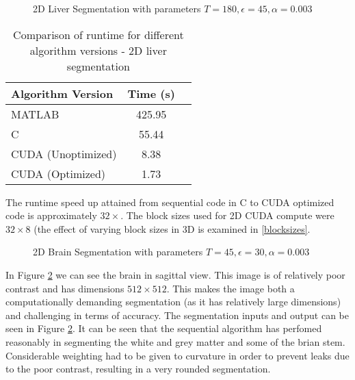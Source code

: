  
\begin{figure}[h]
  \begin{center}
  \end{center}
  \caption{2D Liver Segmentation with parameters $T = 180, \epsilon = 45, \alpha = 0.003$}
  \label{fig:liver}
\end{figure}

\begin{table}[h]
\centering
\begin{tabular}{ | l | c | r | }
	\hline
	Algorithm Version  & Time (s)\\ \hline
  MATLAB 						 & 425.95 \\
  C 								 & 55.44 \\
  CUDA (Unoptimized) & 8.38 \\
  CUDA (Optimized)   & 1.73  \\
  \hline
\end{tabular}\caption{Comparison of runtime for different algorithm versions - 2D liver segmentation}
\label{livertime}
\end{table}

The runtime speed up attained from sequential code in C to CUDA optimized code is approximately $32 \times$. The block sizes used for 2D CUDA compute were $32 \times 8$ (the effect of varying block sizes in 3D is examined in \ref{blocksizes}.


\begin{figure}[h]
  \begin{center}
  \end{center}
  \caption{2D Brain Segmentation with parameters $T = 45, \epsilon = 30, \alpha = 0.003$}
  \label{fig:brain}
\end{figure}

In Figure \ref{fig:brain} we can see the brain in sagittal view. This image is of relatively poor contrast and has dimensions $512 \times 512$. This makes the image both a computationally demanding segmentation (as it has relatively large dimensions) and challenging in terms of accuracy.
The segmentation inputs and output can be seen in Figure \ref{fig:brain}. It can be seen that the sequential algorithm has perfomed reasonably in segmenting the white and grey matter and some of the brian stem. Considerable weighting had to be given to curvature in order to prevent leaks due to the poor contrast, resulting in a very rounded segmentation. 

